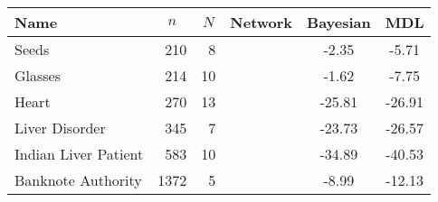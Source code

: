 \scriptsize
\begin{tabular}{lrrcSS}
	\toprule
	Name                    &  &  & Network & {Bayesian}&  {MDL} \\
	\midrule
	Seeds                   & 210  & 8   &   & -2.35            & -5.71       \\
	Glasses                 & 214  & 10  &         & -1.62            & -7.75       \\
	Heart                   & 270  & 13  &   & -25.81           & -26.91      \\
	Liver Disorder          & 345  & 7   &    & -23.73           & -26.57      \\
	Indian Liver Patient    & 583  & 10  &    & -34.89           & -40.53      \\
	Banknote Authority      & 1372 & 5   &    & -8.99           & -12.13  \\
	\bottomrule
\end{tabular}